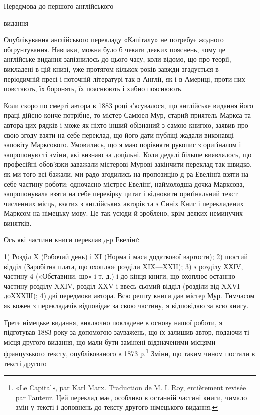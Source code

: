 Передмова до першого англійського

видання

Опублікування англійського перекладу «Капіталу» не потребує
жодного обґрунтування. Навпаки, можна було б чекати деяких
пояснень, чому це англійське видання запізнилось до цього часу,
коли відомо, що про теорії, викладені в цій книзі, уже протягом
кількох років завжди згадується в періодичній пресі і поточній
літературі так в Англії, як і в Америці, проти них повстають, їх
боронять, їх пояснюють і хибно пояснюють.

Коли скоро по смерті автора в 1883 році з’ясувалося, що англійське
видання його праці дійсно конче потрібне, то містер Самюел
Мур, старий приятель Маркса та автора цих рядків і може
як ніхто інший обізнаний з самою книгою, заявив про свою згоду
взяти на себе переклад, що його дати публіці жадали виконавці
заповіту Марксового. Умовились, що я маю порівняти рукопис з
ориґіналом і запропоную ті зміни, які визнаю за доцільні. Коли
дедалі більше виявлялось, що професійні обов’язки заважали
містерові Мурові закінчити переклад так швидко, як ми того всі
бажали, ми радо згодились на пропозицію д-ра Евелінґа взяти
на себе частину роботи; одночасно містрес Евелінґ, наймолодша
дочка Марксова, запропонувала взяти на себе перевірку цитат і
відновити ориґінальний текст численних місць, взятих з англійських
авторів та з Синіх Книг і перекладених Марксом на німецьку
мову. Це так усюди й зроблено, крім деяких неминучих винятків.

Ось які частини книги переклав д-р Евелінґ:

1) Розділ X (Робочий день) і XI (Норма і маса додаткової
вартости); 2) шостий відділ (Заробітна плата, що охоплює розділи
XIX—XXII); 3) з розділу ХХІV, частину 4 («Обставини, що»
і т. д.) і до кінця книги, що охоплює останню частину розділу
XXIV, розділ XXV і ввесь сьомий відділ (розділи від XXVI
доХХХІІІ); 4) дві передмови автора. Всю решту книги дав містер
Мур. Тимчасом як кожен з перекладачів відповідає за свою
частину, я відповідаю за всю книгу.

Третє німецьке видання, виключно покладене в основу нашої
роботи, я підготував 1883 року за допомогою зауважень, що їх
залишив автор, подаючи ті місця другого видання, що мали бути
замінені відзначеними місцями французького тексту, опублікованого
в 1873 р.\footnote*{
«Le Capital», par Karl Marx. Traduction de M. I. Roy, entièrement
revisée par l’auteur. Цей переклад має, особливо в останній частині книги,
чимало змін у тексті і доповнень до тексту другого німецького видання.
} Зміни, що таким чином постали в тексті другого